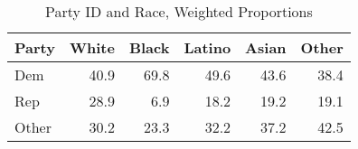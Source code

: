 \begin{table}[ht]
\centering
\begin{tabular}{lrrrrr}
  \toprule
{\textbf{Party}} & {\textbf{White}} & {\textbf{Black}} & {\textbf{Latino}} & {\textbf{Asian}} & {\textbf{Other}} \\ 
  \midrule
Dem & 40.9 & 69.8 & 49.6 & 43.6 & 38.4 \\ 
  Rep & 28.9 & 6.9 & 18.2 & 19.2 & 19.1 \\ 
  Other & 30.2 & 23.3 & 32.2 & 37.2 & 42.5 \\ 
   \bottomrule
\end{tabular}
\caption{Party ID and Race, Weighted Proportions} 
\label{tab:party_race_comp}
\end{table}
